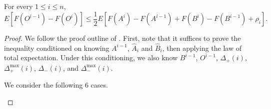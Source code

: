 \begin{lem}\label{lem:singleelement} For every $1 \leq i \leq n$,
\[E[F(O^{i-1})-F(O^i)] \leq \frac{1}{2} E[F(A^i) - F(A^{i-1}) + F(B^i) - F(B^{i-1}) + \rho_i].\]
\end{lem}
\begin{proof}
We follow the proof outline of \cite{buchbinder2012}.
First, note that it suffices to prove the inequality conditioned on knowing $A^{i-1}$, $\hat{A}_i$ and $\hat{B}_i$, then applying the law of total expectation.
Under this conditioning, we also know $B^{i-1}$, $O^{i-1}$, $\Delta_+(i)$, $\Delta_+^{\max}(i)$, $\Delta_-(i)$, and $\Delta_-^{\max}(i)$.



We consider the following 6 cases.

\begin{description}


\end{description}
\end{proof}
